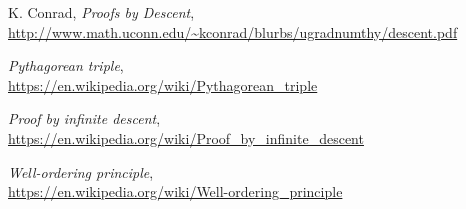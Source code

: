 \documentclass[a4paper, 10pt]{article}
\newcommand{\naslov}[1]{\textit{#1}}
\begin{document}
\begin{thebibliography}{99}

 K. Conrad,
\naslov{Proofs by Descent},
\\\url{http://www.math.uconn.edu/~kconrad/blurbs/ugradnumthy/descent.pdf}

\naslov{Pythagorean triple},
\\\url{https://en.wikipedia.org/wiki/Pythagorean_triple}

\naslov{Proof by infinite descent},
\\\url{https://en.wikipedia.org/wiki/Proof_by_infinite_descent}

\naslov{Well-ordering principle},
\\\url{https://en.wikipedia.org/wiki/Well-ordering_principle}

\end{thebibliography}
\end{document}
